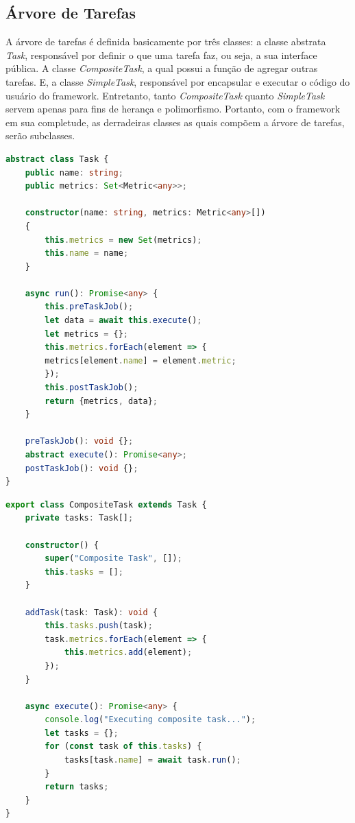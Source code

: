 \documentclass[12pt]{tcc}
\begin{document}
\subsection{Árvore de Tarefas}
\label{task-tree}

A árvore de tarefas é definida basicamente por três classes:
a classe abstrata \emph{Task}, responsável por definir o que uma tarefa faz, ou seja, a sua interface pública.
A classe \emph{CompositeTask}, a qual possui a função de agregar outras tarefas.
E, a classe \emph{SimpleTask}, responsável por encapsular e executar o código do usuário do framework.
Entretanto, tanto \emph{CompositeTask} quanto \emph{SimpleTask} servem apenas para fins de herança e polimorfismo.
Portanto, com o framework em sua completude, as derradeiras classes as quais compõem a árvore de tarefas, serão subclasses.

\begin{lstlisting}[label={lst:abstract_task}, caption={Classe abstrata responsável por definir o que todos os membros da árvore de tarefas precisam implementar.}, language=TypeScript]
abstract class Task {
	public name: string;
	public metrics: Set<Metric<any>>;

	constructor(name: string, metrics: Metric<any>[])
	{
		this.metrics = new Set(metrics);
		this.name = name;
	}

	async run(): Promise<any> {
		this.preTaskJob();
		let data = await this.execute();
		let metrics = {};
		this.metrics.forEach(element => {
		metrics[element.name] = element.metric;
		});
		this.postTaskJob();
		return {metrics, data};
	}

	preTaskJob(): void {};
	abstract execute(): Promise<any>;
	postTaskJob(): void {};
}
\end{lstlisting}

\begin{lstlisting}[label={lst:composite_task}, caption={Tarefa composta, define o comportamento de todos os nós não folha da árvore de tarefas.}, language=TypeScript]
export class CompositeTask extends Task {
	private tasks: Task[];

	constructor() {
		super("Composite Task", []);
		this.tasks = [];
	}

	addTask(task: Task): void {
		this.tasks.push(task);
		task.metrics.forEach(element => {
			this.metrics.add(element);
		});
	}

	async execute(): Promise<any> {
		console.log("Executing composite task...");
		let tasks = {};
		for (const task of this.tasks) {
			tasks[task.name] = await task.run();
		}
		return tasks;
	}
}
\end{lstlisting}
\end{document}

